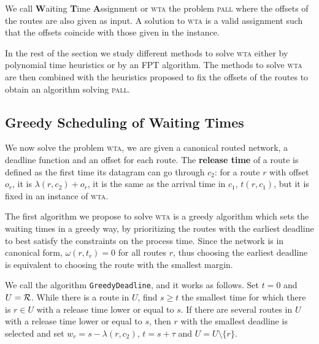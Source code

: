 \documentclass[a4paper,10pt]{journal}
\newcommand\greedydeadline{\texttt{GreedyDeadline}\xspace}
\newcommand\pall{\textsc{pall}\xspace}
\newcommand\wta{\textsc{wta}\xspace}
\begin{document}
 	We call \textbf{W}aiting \textbf{T}ime \textbf{A}ssignment or \wta the problem \pall where the offsets of the routes are also given as input. A solution to \wta
 	is a valid assignment such that the offsets coincide with those given in the instance. 

   In the rest of the section we study different methods to solve \wta either by polynomial time heuristics or by an FPT algorithm. The methods to solve \wta are then combined with the heuristics proposed to fix the offsets of the routes to obtain an algorithm solving \pall.  
   
   \subsection{Greedy Scheduling of Waiting Times}

   We now solve the problem \wta, we are given a canonical routed network, a deadline function and an offset for each route. The \textbf{release time} of a route is defined as the first time its datagram can go through $c_2$: for a route $r$ with offset $o_r$, it is $\lambda(r,c_2) + o_r$, it is the same as the arrival time in $c_1$, $t(r,c_1)$, but it is fixed in an instance of \wta.

    The first algorithm we propose to solve \wta is a greedy algorithm which sets the waiting times in a greedy way, by prioritizing the routes with the earliest deadline to best satisfy the constraints on the process time. Since the network is in canonical form,
    $\omega(r,t_r) = 0$ for all routes $r$, thus choosing the earliest deadline is equivalent to choosing the route with the smallest margin.
    
    We call the algorithm \greedydeadline, and it works as follows. Set $t=0$ and $U = \cal{R}$. While there is a route in $U$, find $s \geq t$ the smallest time for which there is $r \in U$ with a release time lower or equal to $s$. If there are several routes in $U$ with a release time lower or equal  to $s$, then $r$ with the smallest deadline is selected and set $w_r = s - \lambda(r,c_2)$, $t = s + \tau$ and $ U = U \setminus \{r\}$.
\end{document}
